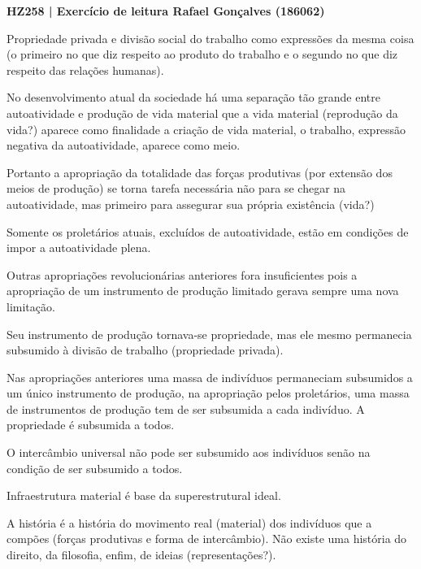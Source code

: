 \documentclass[12pt]{article}
\begin{document}
\noindent
\large\textbf{HZ258 | Exercício de leitura \hfill Rafael Gonçalves (186062)}
\break\hfill

Propriedade privada e divisão social do trabalho como expressões da mesma coisa (o primeiro no que diz respeito ao produto do trabalho e o segundo no que diz respeito das relações humanas).

No desenvolvimento atual da sociedade há uma separação tão grande entre autoatividade e produção de vida material que a vida material (reprodução da vida?) aparece como finalidade a criação de vida material, o trabalho, expressão negativa da autoatividade, aparece como meio.

Portanto a apropriação da totalidade das forças produtivas (por extensão dos meios de produção) se torna tarefa necessária não para se chegar na autoatividade, mas primeiro para assegurar sua própria existência (vida?)

Somente os proletários atuais, excluídos de autoatividade, estão em condições de impor a autoatividade plena.

Outras apropriações revolucionárias anteriores fora insuficientes pois a apropriação de um instrumento de produção limitado gerava sempre uma nova limitação.

Seu instrumento de produção tornava-se propriedade, mas ele mesmo permanecia subsumido à divisão de trabalho (propriedade privada).

Nas apropriações anteriores uma massa de indivíduos permaneciam subsumidos a um único instrumento de produção, na apropriação pelos proletários, uma massa de instrumentos de produção tem de ser subsumida a cada indivíduo. A propriedade é subsumida a todos.

O intercâmbio universal não pode ser subsumido aos indivíduos senão na condição de ser subsumido a todos.

Infraestrutura material é base da superestrutural ideal.

A história é a história do movimento real (material) dos indivíduos que a compões (forças produtivas e forma de intercâmbio). Não existe uma história do direito, da filosofia, enfim, de ideias (representações?).
\end{document}
